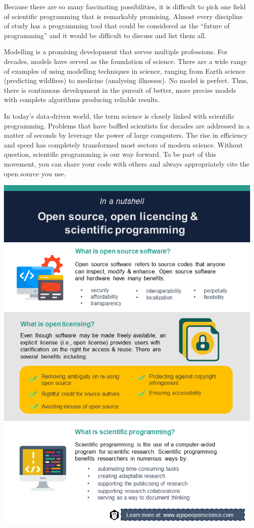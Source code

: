 \documentclass[
]{book}
\begin{document}
Because there are so many fascinating possibilities, it is difficult to pick one field of scientific programming that is remarkably promising. Almost every discipline of study has a programming tool that could be considered as the ``future of programming'' and it would be difficult to discuss and list them all.

Modelling is a promising development that serves multiple professions. For decades, models have served as the foundation of science. There are a wide range of examples of using modelling techniques in science, ranging from Earth science (predicting wildfires) to medicine (analysing illnesses). No model is perfect. Thus, there is continuous development in the pursuit of better, more precise models with complete algorithms producing reliable results.

In today's data-driven world, the term science is closely linked with scientific programming. Problems that have baffled scientists for decades are addressed in a matter of seconds by leverage the power of large computers. The rise in efficiency and speed has completely transformed most sectors of modern science. Without question, scientific programming is our way forward. To be part of this movement, you can share your code with others and always appropriately cite the open source you use.

\begin{center}\includegraphics[width=0.7\linewidth]{images/slide3} \end{center}
\end{document}
